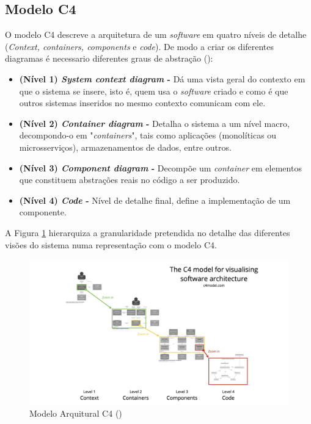 \subsection{Modelo C4}
\label{subsec:modelC4}

O modelo C4 descreve a arquitetura de um \textit{software} em quatro níveis de detalhe (\textit{Context, containers, components} e \textit{code}). De modo a criar os diferentes diagramas é necessario diferentes graus de abstração (\cite{Brown2018}):

\begin{itemize}
    \item \textbf{(Nível 1) \textit{System context diagram} -} Dá uma vista geral do contexto em que o sistema se insere, isto é, quem usa o \textit{software} criado e como é que outros sistemas inseridos no mesmo contexto comunicam com ele. 
    \item \textbf{(Nível 2) \textit{Container diagram} -} Detalha o sistema a um nível macro, decompondo-o em "\textit{containers}", tais como aplicações (monolíticas ou microsserviços), armazenamentos de dados, entre outros.
    \item \textbf{(Nível 3) \textit{Component diagram} -} Decompõe um \textit{container} em elementos que constituem abstrações reais no código a ser produzido.
    \item \textbf{(Nível 4) \textit{Code} -} Nível de detalhe final, define a implementação de um componente.
\end{itemize}

A Figura \ref{fig:c4model} hierarquiza a granularidade pretendida no detalhe das diferentes visões do sistema numa representação com o modelo C4.

\begin{figure}[H]
    \centering
    \includegraphics[width=6.5in,keepaspectratio]{frontmatter/assets/models/c4-overview.png}
    \caption{Modelo Arquitural C4 (\cite{C4Model})}
    \label{fig:c4model}
\end{figure}

